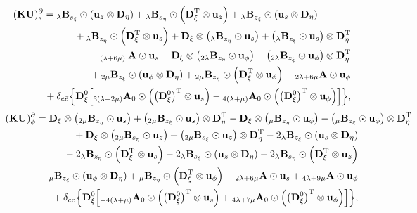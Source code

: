 \documentclass[11pt,letter,fleqn,english,notitlepage]{article}
\newcommand{\bu}{\mbox{${\bf u}$}} \newcommand{\bv}{\mbox{${\bf v}$}}
\newcommand{\bD}{\mbox{${\bf D}$}} \newcommand{\bU}{\mbox{${\bf U}$}}
\newcommand{\bK}{\mbox{${\bf K}$}} \newcommand{\bS}{\mbox{${\bf S}$}}
\newcommand{\bA}{\mbox{${\bf A}$}} \newcommand{\bQ}{\mbox{${\bf Q}$}}
\begin{document}
\begin{eqnarray}
\lefteqn{
(\bK\bU)_s^{\partial}=
{{}_\lambda\bB}_{s_\xi} \odot \left(\bu_z\otimes\bD_{\eta}\right)+
{{}_\lambda\bB}_{s_\eta} \odot \left(\bD_\xi^{\rm{T}}\otimes{\bu_z}\right)+
{{}_\lambda\bB}_{z_\xi} \odot 
\left(\bu_s{}\otimes\bD_{\eta}\right)}
\nonumber\\&&\mbox{}\hspace{2.2em}
+{{}_\lambda\bB}_{z_\eta} \odot \left(\bD_\xi^{\rm{T}}\otimes{\bu_s}\right)
+ \bD_{\xi}\otimes\left({{}_\lambda\bB}_{z_\eta} \odot {\bu_s}\right)
+\left({{}_\lambda\bB}_{z_\xi} \odot {\bu_s}\right)\otimes\bD_{\eta}^{\rm{T}}
\nonumber\\&&\mbox{}\hspace{2.2em}
+ _{(\lambda+6\mu)}\bA\odot\bu_s 
-\bD_\xi\otimes\left({}_{2\lambda}\bB_{z_\eta}\odot{\bu_\phi}\right)
- \left({}_{2\lambda}\bB_{z_\xi}\odot{\bu_\phi}\right)\otimes\bD^{\rm{T}}_\eta 
 \nonumber\\&&\mbox{}\hspace{2.2em} 
+{}_{2\mu}\bB_{z_\xi}\odot\left(\bu_\phi\otimes\bD_\eta\right)
+{}_{2\mu}\bB_{z_\eta}\odot\left(\bD^{\rm{T}}_\xi\otimes \bu_\phi\right)
 - {}_{2\lambda+6\mu}\bA\odot \bu_\phi
 \nonumber\\&&\mbox{}\hspace{2.2em}  
+ \delta_{e\bar{e}}\Bigl\{
\bD^0_\xi\Bigl[{}_{3(\lambda+2\mu)}{\bA_0}\odot
\left(\left(\bD^0_\xi\right)^{\rm{T}}\otimes \bu_s\right)
-{}_{4(\lambda+\mu)}{\bA_0}
\odot\left(\left(\bD^0_\xi\right)^{\rm{T}} \otimes \bu_\phi\right)\Bigr]
\Bigr\},
\end{eqnarray}
%
\begin{eqnarray}
\lefteqn{(\bK\bU)_\phi^{\partial} =
\bD_\xi\otimes\left({}_{2\mu}\bB_{z_\eta}\odot{\bu_s}\right)+
\left({}_{2\mu}\bB_{z_\xi}\odot{\bu_s}\right)\otimes\bD^{\rm{T}}_\eta-
\bD_\xi\otimes\left({}_{\mu}\bB_{z_\eta}\odot{\bu_\phi}\right)-
\left({}_{\mu}\bB_{z_\xi}\odot{\bu_\phi}\right)\otimes\bD^{\rm{T}}_\eta 
}\nonumber\\&&\mbox{}\hspace{2.2em}
+\bD_\xi\otimes\left(_{2\mu}\bB_{s_\eta}\odot{\bu_z}\right)
+\left({}_{2\mu}\bB_{s_\xi}\odot{\bu_z}\right)\otimes\bD^{\rm{T}}_\eta-
2{}_\lambda\bB_{z_\xi}\odot\left(\bu_s\otimes\bD_\eta\right)
\nonumber\\&&\mbox{}\hspace{2.2em} 
-2{}_\lambda\bB_{z_\eta}\odot\left(\bD^{\rm{T}}_\xi\otimes \bu_s\right) 
-2{}_\lambda\bB_{s_\xi}\odot\left(\bu_z\otimes\bD_\eta\right)
- 2{}_\lambda\bB_{s_\eta}\odot\left(\bD^{\rm{T}}_\xi\otimes \bu_z\right)
\nonumber\\&&\mbox{}\hspace{2.2em} 
-{}_{\mu}\bB_{z_\xi}\odot\left(\bu_\phi\otimes\bD_\eta\right)
+{}_{\mu}\bB_{z_\eta}\odot\left(\bD^{\rm{T}}_\xi\otimes \bu_\phi\right) 
-{}_{2\lambda+6\mu}\bA\odot \bu_s 
+ {}_{4\lambda+9\mu}\bA\odot \bu_\phi 
\nonumber\\&&\mbox{}\hspace{2.2em}
+\delta_{e\bar{e}}\Bigl\{\bD^0_\xi\Bigl[
{}_{-4(\lambda+\mu)}{\bA_0}
\odot\left(\left(\bD^0_\xi\right)^{\rm{T}} \otimes \bu_s\right)
+{}_{4\lambda+7\mu}{\bA_0}
\odot\left(\left(\bD^0_\xi\right)^{\rm{T}} \otimes \bu_\phi\right)\Bigr]
\Bigr\},
\end{eqnarray}
\end{document}

